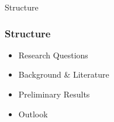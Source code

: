 \begin{frame}[label=toc]{Structure}
    \frametitle{Structure}
    \begin{itemize}
        \item Research Questions
        \item Background \& Literature
        \item Preliminary Results
        \item Outlook
    \end{itemize}
\end{frame}